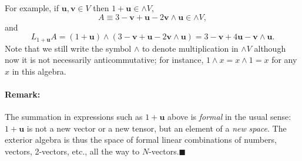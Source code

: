 For example, if $\mathbf{u},\mathbf{v}\in V$ then $1+\mathbf{u}\in\wedge V$,\[
A\equiv3-\mathbf{v}+\mathbf{u}-2\mathbf{v}\wedge\mathbf{u}\in\wedge V,\]
and\[
L_{1+\mathbf{u}}A=\left(1+\mathbf{u}\right)\wedge\left(3-\mathbf{v}+\mathbf{u}-2\mathbf{v}\wedge\mathbf{u}\right)=3-\mathbf{v}+4\mathbf{u}-\mathbf{v}\wedge\mathbf{u}.\]
Note that we still write the symbol $\wedge$ to denote multiplication
in $\wedge V$ although now it is not necessarily anticommutative;
for instance, $1\wedge x=x\wedge1=x$ for any $x$ in this algebra.


\paragraph{Remark: }

The summation in expressions such as $1+\mathbf{u}$ above is \emph{formal}
in the usual sense: $1+\mathbf{u}$ is not a new vector or a new tensor,
but an element of a \emph{new} \emph{space}. The exterior algebra
is thus the space of formal linear combinations of numbers, vectors,
2-vectors, etc., all the way to $N$-vectors.\hfill{}$\blacksquare$

